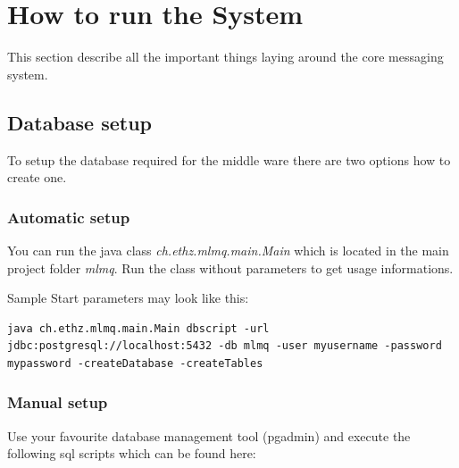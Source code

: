 \documentclass[a4paper]{article}
\begin{document}








\section{How to run the System}

This section describe all the important things laying around the core messaging system.

\subsection{Database setup}

To setup the database required for the middle ware there are two options
how to create one.

\subsubsection{Automatic setup}
You can run the java class \textit{ch.ethz.mlmq.main.Main} which is located in the main project folder \textit{mlmq}. Run the class without parameters to get usage informations.

Sample Start parameters may look like this:

\begin{verbatim} 
java ch.ethz.mlmq.main.Main dbscript -url jdbc:postgresql://localhost:5432 -db mlmq -user myusername -password mypassword -createDatabase -createTables
\end{verbatim}

\subsubsection{Manual setup}
Use your favourite database management tool (pgadmin) and execute the following sql scripts which can be found here:
\end{document}
